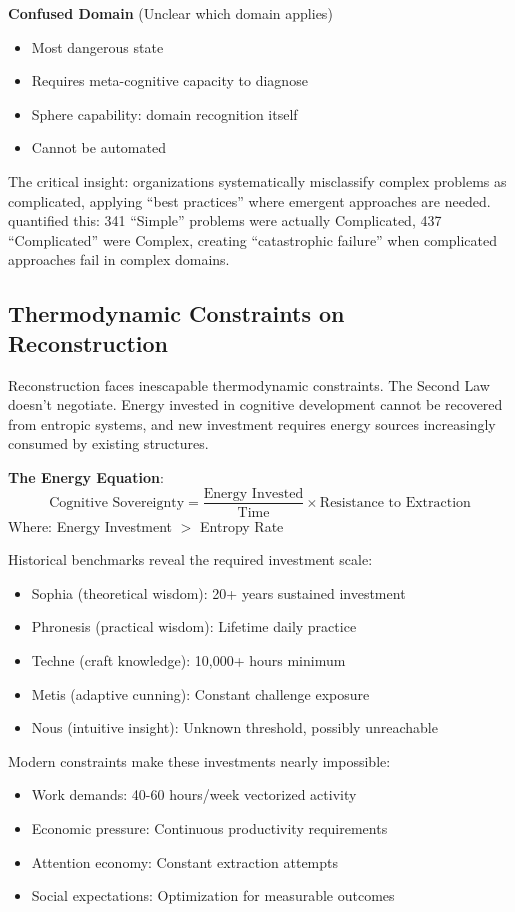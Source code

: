 \textbf{Confused Domain} (Unclear which domain applies)
\begin{itemize}
\item Most dangerous state
\item Requires meta-cognitive capacity to diagnose
\item Sphere capability: domain recognition itself
\item Cannot be automated
\end{itemize}

The critical insight: organizations systematically misclassify complex problems as complicated, applying ``best practices'' where emergent approaches are needed. \citet{ford2024} quantified this: 341 ``Simple'' problems were actually Complicated, 437 ``Complicated'' were Complex, creating ``catastrophic failure'' when complicated approaches fail in complex domains.

\subsection{Thermodynamic Constraints on Reconstruction}

Reconstruction faces inescapable thermodynamic constraints. The Second Law doesn't negotiate. Energy invested in cognitive development cannot be recovered from entropic systems, and new investment requires energy sources increasingly consumed by existing structures.

\textbf{The Energy Equation}:
\begin{equation}
\text{Cognitive Sovereignty} = \frac{\text{Energy Invested}}{\text{Time}} \times \text{Resistance to Extraction}
\end{equation}
Where: Energy Investment $>$ Entropy Rate

Historical benchmarks reveal the required investment scale:
\begin{itemize}
\item Sophia (theoretical wisdom): 20+ years sustained investment
\item Phronesis (practical wisdom): Lifetime daily practice
\item Techne (craft knowledge): 10,000+ hours minimum \citep{ericsson1993}
\item Metis (adaptive cunning): Constant challenge exposure
\item Nous (intuitive insight): Unknown threshold, possibly unreachable
\end{itemize}

Modern constraints make these investments nearly impossible:
\begin{itemize}
\item Work demands: 40-60 hours/week vectorized activity
\item Economic pressure: Continuous productivity requirements
\item Attention economy: Constant extraction attempts
\item Social expectations: Optimization for measurable outcomes
\end{itemize}

